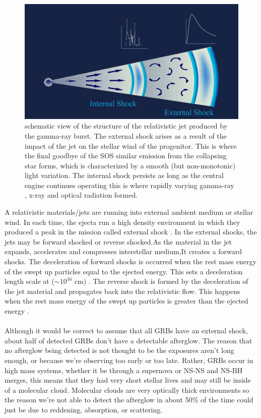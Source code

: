 \begin{figure}[h]
\begin{center}
\includegraphics[scale=0.3]{Figures/fig7.png}
\caption {schematic view of the structure of the relativistic jet produced by the gamma-ray burst. The external shock arises as a result of the impact of the jet on the stellar wind of the progenitor. This is where the final goodbye of the SOS
similar emission from the collapsing star forms, which is characterized by a smooth (but non-monotonic) light variation. The internal shock persists as long as the central engine continues operating this is where rapidly varying gamma-ray , x-ray  and optical radiation formed.\citep{21}}
\end{center}
\end{figure}
A relativistic materials/jets are running into  external ambient medium or stellar wind. In each time, the ejecta run a high density environment in which they produced a peak in the mission called external shock . In the external shocks, the jets may be forward shocked or reverse shocked.As the material in the jet expands, accelerates and compresses interstellar medium,It creates a forward shocks. The deceleration of forward shocks is occurred when the rest mass energy of the swept up particles equal to the ejected energy. This sets a deceleration length scale at ($\sim  10^{16} $ cm) . The reverse shock is formed by the deceleration of the jet material and propagates back into the relativistic flow. This happens when the rest mass energy of the swept up particles is greater than the ejected energy .\citep{20}\\\\
Although it would be correct to assume that all GRBs have an external shock, about half of detected GRBs don't have a detectable afterglow. The reason that no afterglow  being detected is not thought to be the exposures aren't long enough, or because we're observing too early or too late. Rather, GRBs occur in high mass systems, whether it be through a supernova or NS-NS and NS-BH merges, this means that they had very short stellar lives and may still be inside of a molecular cloud. Molecular clouds are very optically thick environments so the reason we're not able to detect the afterglow in about 50\%  of the time could just be due to reddening, absorption, or scattering.\citep{20, 21}
